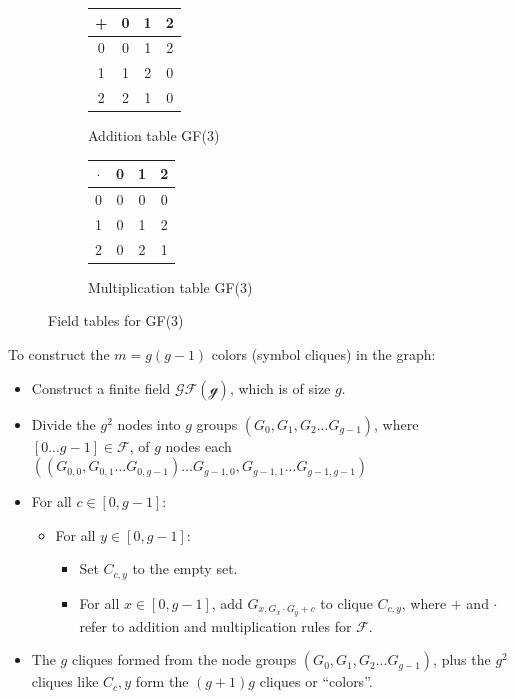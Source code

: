\documentclass[11pt, oneside]{article} 	%
\begin{document}
\begin{figure}[!htb]
\centering
\begin{subfigure}{.3\textwidth}
 \centering
 \begin{tabular}{c | c c c}
   + & 0 & 1 & 2 \\
\hline
   0 & 0 & 1 & 2 \\
   1 & 1 & 2 & 0 \\
   2 & 2 & 1 & 0 \\
   \end{tabular}
 \caption{Addition table GF(3)}
\label{fig:gf3-add}
\end{subfigure}
\begin{subfigure}{.3\textwidth}
 \centering
\begin{tabular}{c | c c c}
   $\cdot$ & 0 & 1 & 2 \\
\hline
   0 & 0 & 0 & 0 \\
   1 & 0 & 1 & 2 \\
   2 & 0 & 2 & 1 \\

\end{tabular}
\caption{Multiplication table GF(3)}
\label{fig:gf3-mult}
\end{subfigure}
\caption{Field tables for GF(3)}
\label{fig:gf3-tables}
\end{figure}

\begin{framed}
To construct the $m = g(g-1)$ colors (symbol cliques) in the graph:
\begin{itemize}
 \item Construct a finite field $\mathcal{GF(g)}$, which is of size $g$.
 \item Divide the $g^2$ nodes into $g$ groups $(G_0, G_1, G_2 ... G_{g-1})$, where $[0...g-1] \in \mathcal{F}$, of $g$ nodes each $((G_{0,0}, G_{0,1}...G_{0,g-1}) ...G_{g-1,0}, G_{g-1,1}...G_{g-1,g-1})$
 \item For all $c \in [0,g-1]$: 
 \begin{itemize}
  \item For all $y \in [0,g-1]$:  
  \begin{itemize}
    \item Set $C_{c,y}$ to the empty set.
    \item For all $x \in [0,g-1]$, add $G_{x, G_x \cdot G_y + c}$ to clique $C_{c, y}$, where $+$ and $\cdot$ refer to addition and multiplication rules for $\mathcal{F}$.
   \end{itemize}
 \end{itemize}
 \item The $g$ cliques formed from the node groups $(G_0, G_1, G_2 ... G_{g-1})$, plus the $g^2$ cliques like $C_c, y$ form the $(g+1)g$ cliques or ``colors''.
\end{itemize}
\end{framed}
\end{document}
